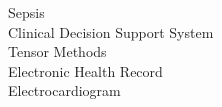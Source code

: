 Sepsis\\
Clinical Decision Support System\\
Tensor Methods\\
Electronic Health Record\\
Electrocardiogram\\